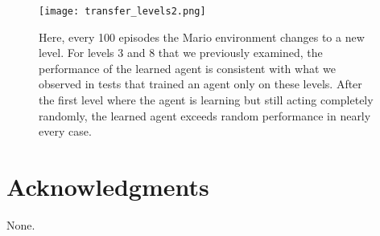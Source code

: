 \documentclass{article}
\begin{document}
 \begin{figure}
\begin{center}
\texttt{[image: transfer\_levels2.png]}
\caption{Here, every 100 episodes the Mario environment changes to a new level. For levels 3 and 8 that we previously examined, the performance of the learned agent is consistent with what we observed in tests that trained an agent only on these levels. After the first level where the agent is learning but still acting completely randomly, the learned agent exceeds random performance in nearly every case.}
\end{center}
\end{figure}
 
\section*{Acknowledgments} 
 
None.



\end{document}
